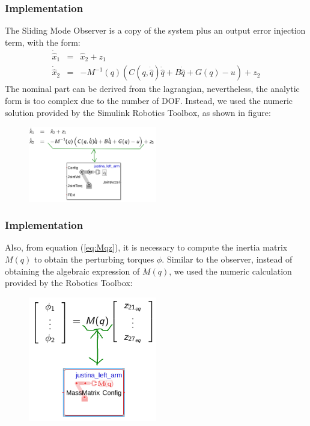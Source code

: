 \documentclass[9pt,spanish,aspectratio=1610]{beamer}
\begin{document}
\begin{frame}
\begin{columns}
\begin{column}{0.3\textwidth}
    \end{column}
  \end{columns}
\end{frame}

\begin{frame}\frametitle{Implementation}
  The Sliding Mode Observer is a copy of the system plus an output error injection term, with the form:
  \begin{eqnarray}
    \dot{\hat{x}}_1 &=& \hat{x}_2 + z_1\label{eq:observer1}\\
    \dot{\hat{x}}_2 &=& -M^{-1}(q)\left(C(q, \dot{\hat{q}})\dot{\hat{q}} + B\dot{\hat{q}} + G(q) - u\right) + z_2\label{eq:observer2}
  \end{eqnarray}
  The nominal part can be derived from the lagrangian, nevertheless, the analytic form is too complex due to the number of DOF. Instead, we used the numeric solution provided by the Simulink Robotics Toolbox, as shown in figure:
  \begin{figure}
    \centering
    \includegraphics[width=0.5\textwidth]{Figures/SMO.png}
  \end{figure}
\end{frame}

\begin{frame}\frametitle{Implementation}
  Also, from equation (\ref{eq:Mqz}), it is necessary to compute the inertia matrix $M(q)$ to obtain the perturbing torques $\phi$. Similar to the observer, instead of obtaining the algebraic expression of $M(q)$, we used the numeric calculation provided by the Robotics Toolbox:
    \begin{figure}
    \centering
    \includegraphics[width=0.5\textwidth]{Figures/MassEst.png}
  \end{figure}
\end{frame}
\end{document}
